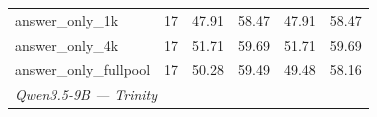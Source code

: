 \begin{table}[t]
{\begin{tabular}{lrrrrr}
answer\_only\_1k & 17 & 47.91 & 58.47 & 47.91 & 58.47 \\
answer\_only\_4k & 17 & 51.71 & 59.69 & 51.71 & 59.69 \\
answer\_only\_fullpool & 17 & 50.28 & 59.49 & 49.48 & 58.16 \\
\midrule
\multicolumn{6}{l}{\textit{Qwen3.5-9B --- Trinity}} \\

\end{tabular}}
\end{table}
